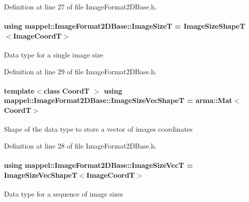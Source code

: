 Definition at line 27 of file Image\+Format2\+D\+Base.\+h.

\paragraph[{\texorpdfstring{Image\+SizeT}{ImageSizeT}}]{\setlength{\rightskip}{0pt plus 5cm}using {\bf mappel\+::\+Image\+Format2\+D\+Base\+::\+Image\+SizeT} =  {\bf Image\+Size\+ShapeT}$<${\bf Image\+CoordT}$>$\hspace{0.3cm}{\ttfamily [inherited]}}\hypertarget{classmappel_1_1ImageFormat2DBase_a49cccf61eb2a768a202634d27fcd81d5}{}\label{classmappel_1_1ImageFormat2DBase_a49cccf61eb2a768a202634d27fcd81d5}
Data type for a single image size 

Definition at line 29 of file Image\+Format2\+D\+Base.\+h.

\paragraph[{\texorpdfstring{Image\+Size\+Vec\+ShapeT}{ImageSizeVecShapeT}}]{\setlength{\rightskip}{0pt plus 5cm}template$<$class CoordT $>$ using {\bf mappel\+::\+Image\+Format2\+D\+Base\+::\+Image\+Size\+Vec\+ShapeT} =  arma\+::\+Mat$<$CoordT$>$\hspace{0.3cm}{\ttfamily [inherited]}}\hypertarget{classmappel_1_1ImageFormat2DBase_afe9ededf04942330121003e3dd8f9311}{}\label{classmappel_1_1ImageFormat2DBase_afe9ededf04942330121003e3dd8f9311}
Shape of the data type to store a vector of image\textquotesingle{}s coordinates 

Definition at line 28 of file Image\+Format2\+D\+Base.\+h.

\paragraph[{\texorpdfstring{Image\+Size\+VecT}{ImageSizeVecT}}]{\setlength{\rightskip}{0pt plus 5cm}using {\bf mappel\+::\+Image\+Format2\+D\+Base\+::\+Image\+Size\+VecT} =  {\bf Image\+Size\+Vec\+ShapeT}$<${\bf Image\+CoordT}$>$\hspace{0.3cm}{\ttfamily [inherited]}}\hypertarget{classmappel_1_1ImageFormat2DBase_aa88536c52195a927cf32558856f05a13}{}\label{classmappel_1_1ImageFormat2DBase_aa88536c52195a927cf32558856f05a13}
Data type for a sequence of image sizes 

